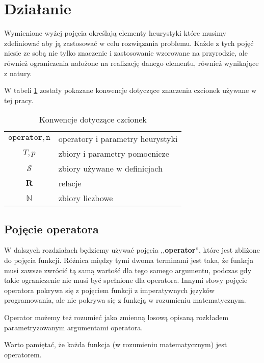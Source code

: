 \documentclass[twoside]{iisthesis}
\newcommand{\numberSet}{\mathbb}
\newcommand{\important}{\mathcal}
\newcommand{\R}{\mathbf{R}}
\newcommand{\param}{\mathtt}
\begin{document}
\section{Działanie}

Wymienione wyżej pojęcia określają elementy heurystyki które musimy zdefiniować aby ją zastosować w celu rozwiązania problemu. Każde z tych pojęć niesie ze sobą nie tylko znaczenie i zastosowanie wzorowane na przyrodzie, ale również ograniczenia nałożone na realizację danego elementu, również wynikające z natury.

W tabeli \ref{table:signature_conventions} zostały pokazane konwencje dotyczące znaczenia czcionek używane w tej pracy.


\begin{table}
	\caption{Konwencje dotyczące czcionek \label{table:signature_conventions}}
	\centering
	\begin{tabular}{cl}
		$\param{operator}, \param{n}$ & operatory i parametry heurystyki \\
		$T, p$ & zbiory i parametry pomocnicze \\
		$\important{S}$ & zbiory używane w definicjach \\
		$\R$ & relacje \\
		$\numberSet{N}$ & zbiory liczbowe
	\end{tabular}
\end{table}

\subsection{Pojęcie operatora} \label{subsection:operator}

W dalszych rozdziałach będziemy używać pojęcia ,,\textbf{operator}'', które jest zbliżone do pojęcia funkcji. Różnica między tymi dwoma terminami jest taka, że funkcja musi zawsze zwrócić tą samą wartość dla tego samego argumentu, podczas gdy takie ograniczenie nie musi być spełnione dla operatora. Innymi słowy pojęcie operatora pokrywa się z pojęciem funkcji z imperatywnych języków programowania, ale nie pokrywa się z funkcją w rozumieniu matematycznym.

Operator możemy też rozumieć jako zmienną losową opisaną rozkładem parametryzowanym argumentami operatora.

Warto pamiętać, że każda funkcja (w rozumieniu matematycznym) jest operatorem.
\end{document}

